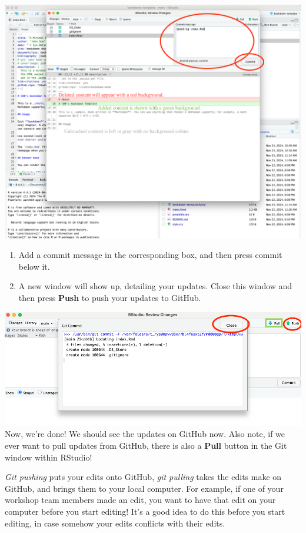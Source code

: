 \documentclass[
]{book}
\theoremstyle{definition}
\theoremstyle{definition}
\theoremstyle{definition}
\theoremstyle{definition}
\theoremstyle{remark}
\begin{document}
\includegraphics{img/git-instruct/git-commit-window.png}\\

\begin{enumerate}
\def\labelenumi{\arabic{enumi}.}
\setcounter{enumi}{14}
\item
  Add a commit message in the corresponding box, and then press commit below it.
\item
  A new window will show up, detailing your updates. Close this window and then press \textbf{Push} to push your updates to GitHub.
\end{enumerate}

\includegraphics{img/git-instruct/git-window-post-commit.png}\\

Now, we're done! We should see the updates on GitHub now. Also note, if we ever want to pull updates from GitHub, there is also a \textbf{Pull} button in the Git window within RStudio!

\emph{Git pushing} puts your edits onto GitHub, \emph{git pulling} takes the edits make on GitHub, and brings them to your local computer. For example, if one of your workshop team members made an edit, you want to have that edit on your computer before you start editing! It's a good idea to do this before you start editing, in case somehow your edits conflicts with their edits.
\end{document}
